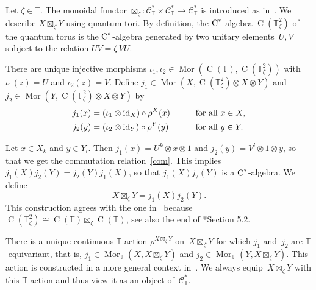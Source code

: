 \documentclass[a4paper]{amsart}
\numberwithin{equation}{section}
\theoremstyle{definition}
\theoremstyle{remark}
\begin{document}
Let $\zeta\in{{\mathbb T}}$.  The monoidal functor ${\boxtimes}_{\zeta}\colon
\mathcal{C}^*_{\mathbb{T}}\times
\mathcal{C}^*_{\mathbb{T}}\rightarrow \mathcal{C}^*_{\mathbb{T}}$ is
introduced as in~\cite{Meyer-Roy-Woronowicz:Twisted_tensor}.  We
describe $X{\boxtimes}_\zeta Y$ using quantum tori.  By definition, the
${\textup{C}^*}${\nobreakdash}-algebra $\operatorname{C}({{\mathbb T}}^{2}_{\zeta})$ of the quantum torus is
the ${\textup{C}^*}${\nobreakdash}-algebra generated by two unitary elements~$U,V$
subject to the relation \(UV=\zeta\, VU\).

There are unique injective morphisms
$\iota_1,\iota_2\in{\operatorname{Mor}}(\operatorname{C}(\mathbb{T}),\operatorname{C}(\mathbb{T}^{2}_{\zeta}))$
with $\iota_1(z) = U$ and $\iota_2(z) = V$.  Define
$j_1\in{\operatorname{Mor}}(X,\operatorname{C}(\mathbb{T}^{2}_{\zeta})\otimes X\otimes Y)$ and
$j_2\in{\operatorname{Mor}}(Y,\operatorname{C}(\mathbb{T}^{2}_{\zeta})\otimes X\otimes Y)$ by
\begin{alignat*}{2}
  j_1(x) &= (\iota_1\otimes{\textup{id}}_X)\circ\rho^X(x)
  &\qquad &\text{for all }x\in X,\\
  j_2(y) &= (\iota_2\otimes{\textup{id}}_Y)\circ\rho^Y(y)
  &\qquad &\text{for all }y\in Y.
\end{alignat*}

Let $x\in X_k$ and $y\in Y_l$.  Then $j_1(x) = U^k\otimes x\otimes 1$ and
$j_2(y) = V^l\otimes 1\otimes y$, so that we get the commutation
relation~\eqref{com}.  This implies $j_1(X)j_2(Y) =j_2(Y) j_1(X)$, so
that $j_1(X)j_2(Y)$ is a ${\textup{C}^*}${\nobreakdash}-algebra.  We define
\[
X{\boxtimes}_{\zeta} Y = j_1(X)j_2(Y).
\]
This construction agrees with the one
in~\cite{Meyer-Roy-Woronowicz:Twisted_tensor} because
\(\operatorname{C}(\mathbb{T}^{2}_{\zeta}) \cong \operatorname{C}(\mathbb{T}) {\boxtimes}_{\zeta}
\operatorname{C}(\mathbb{T})\), see also the end of
\cite{Meyer-Roy-Woronowicz:Twisted_tensor}*{Section 5.2}.

There is a unique continuous $\mathbb{T}${\nobreakdash}-action
$\rho^{X{\boxtimes}_\zeta Y}$ on~\(X{\boxtimes}_\zeta Y\) for which \(j_1\)
and~\(j_2\) are \(\mathbb{T}\){\nobreakdash}-equivariant, that is,
$j_1\in{\operatorname{Mor}}_{\mathbb{T}}(X,X{\boxtimes}_{\zeta}Y)$ and
$j_2\in{\operatorname{Mor}}_{\mathbb{T}}(Y,X{\boxtimes}_{\zeta}Y)$.  This action is
constructed in a more general context
in~\cite{Meyer-Roy-Woronowicz:Twisted_tensor_2}.  We always
equip~$X{\boxtimes}_\zeta Y$ with this \(\mathbb{T}\){\nobreakdash}-action and thus
view it as an object of~$\mathcal{C}^*_{\mathbb{T}}$.
\end{document}
